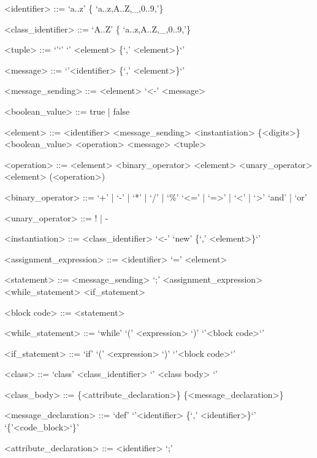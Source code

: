 \documentclass{eplDoc}
\begin{document}
\maketitle
\newpage

\begin{grammar}
<identifier> ::= `a..z' \{ `a..z,A..Z,\_,0..9,'\} 

<class\_identifier> ::= `A..Z' \{ `a..z,A..Z,\_,0..9,'\} 

<tuple> ::= `{'`}' \alt `{' <element> \{`,' <element>\}`}'

<message> ::= `{'<identifier> \{`,' <element>\}`}'

<message\_sending> ::= <element> `<-' <message>

<boolean\_value> ::= true | false

<element> ::= <identifier> 
\alt<message\_sending>
\alt<instantiation>
\alt \{<digits>\}
\alt <boolean\_value>
\alt <operation>
\alt <message>
\alt <tuple>

<operation> ::= <element> <binary\_operator> <element>
\alt <unary\_operator> <element>
\alt (<operation>)

<binary\_operator> ::= `+' | `-' | `*' | `/' | `\%' 
\alt `<=' | `=>' | `<' | `>'
\alt `and' | `or'

<unary\_operator> ::= ! | - 

<instantiation> ::= <class\_identifier> `<-' `{new' \{`,' <element>\}`}'


<assignment\_expression> ::= <identifier> `=' <element>

<statement> ::= <message\_sending> `;'
\alt <assignment\_expression>
\alt <while\_statement>
\alt <if\_statement>

<block code> ::= { <statement> }

<while\_statement> ::= `while' `(' <expression> `)'  `{'<block code>`}'

<if\_statement> ::= `if' `(' <expression> `)'  `{'<block code>`}'




<class> ::= `class' <class\_identifier> `{' <class body> `}'

<class\_body> ::= \{<attribute\_declaration>\} \{<message\_declaration>\}

<message\_declaration> ::= `def'  `{'<identifier> \{`,' <identifier>\}`}' `\{'<code\_block>`\}'

<attribute\_declaration> ::= <identifier> `;'









\end{grammar}
\end{document}
